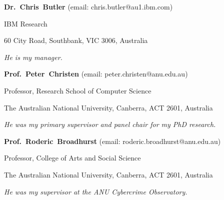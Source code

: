 \documentclass[10pt]{article}
\newcommand{\halfblankline}{\quad\vspace{-0.5\baselineskip}\pagebreak[3]}
\begin{document}
\textbf{Dr.~Chris~Butler} (email: chris.butler@au1.ibm.com)
%
\begin{innerlist}
	\item IBM Research
	\item 60 City Road, Southbank, VIC 3006, Australia
	\item \emph{He is my manager.}
\end{innerlist}

\halfblankline

\textbf{Prof.~Peter~Christen} (email: peter.christen@anu.edu.au)
%
\begin{innerlist}
	\item Professor, Research School of Computer Science
	\item The Australian National University, Canberra, ACT 2601, Australia
	\item \emph{He was my primary supervisor and panel chair for my PhD research.}
\end{innerlist}

\halfblankline

\textbf{Prof.~Roderic~Broadhurst} (email: roderic.broadhurst@anu.edu.au)
%
\begin{innerlist}
	\item Professor, College of Arts and Social Science
	\item The Australian National University, Canberra, ACT 2601, Australia
	\item \emph{He was my supervisor at the ANU Cybercrime Observatory.}
\end{innerlist}


%


\end{document}
